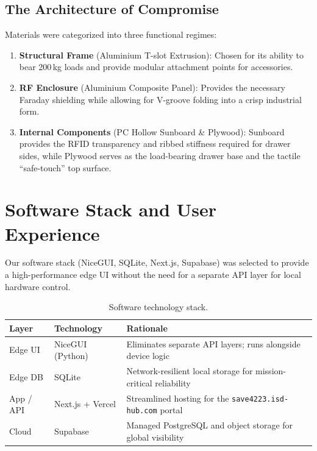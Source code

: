 \documentclass[12pt, a4paper]{article}
\begin{document}
\subsection{The Architecture of Compromise}

Materials were categorized into three functional regimes:

\begin{enumerate}[nosep]
  \item \textbf{Structural Frame} (Aluminium T-slot Extrusion): Chosen for its ability to bear 200\,kg loads and provide modular attachment points for accessories.
  \item \textbf{RF Enclosure} (Aluminium Composite Panel): Provides the necessary Faraday shielding while allowing for V-groove folding into a crisp industrial form.
  \item \textbf{Internal Components} (PC Hollow Sunboard \& Plywood): Sunboard provides the RFID transparency and ribbed stiffness required for drawer sides, while Plywood serves as the load-bearing drawer base and the tactile ``safe-touch'' top surface.
\end{enumerate}

\section{Software Stack and User Experience}
\label{sec:software}

Our software stack (NiceGUI, SQLite, Next.js, Supabase) was selected to provide a high-performance edge UI without the need for a separate API layer for local hardware control.

\begin{table}[H]
\centering
\caption{Software technology stack.}
\begin{tabularx}{\textwidth}{llX}
\toprule
\textbf{Layer} & \textbf{Technology} & \textbf{Rationale} \\
\midrule
Edge UI   & NiceGUI (Python)   & Eliminates separate API layers; runs alongside device logic \\
Edge DB   & SQLite             & Network-resilient local storage for mission-critical reliability \\
App / API & Next.js + Vercel   & Streamlined hosting for the \texttt{save4223.isd-hub.com} portal \\
Cloud     & Supabase           & Managed PostgreSQL and object storage for global visibility \\
\bottomrule
\end{tabularx}
\end{table}
\end{document}
